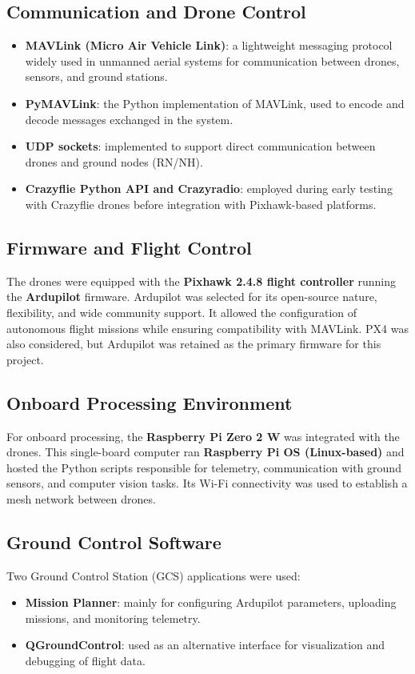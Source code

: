 \subsection*{Communication and Drone Control}
\begin{itemize}
    \item \textbf{MAVLink (Micro Air Vehicle Link)}: a lightweight messaging protocol 
    widely used in unmanned aerial systems for communication between drones, sensors, 
    and ground stations.  
    \item \textbf{PyMAVLink}: the Python implementation of MAVLink, used to encode and 
    decode messages exchanged in the system.  
    \item \textbf{UDP sockets}: implemented to support direct communication between 
    drones and ground nodes (RN/NH).  
    \item \textbf{Crazyflie Python API and Crazyradio}: employed during early testing 
    with Crazyflie drones before integration with Pixhawk-based platforms.  
\end{itemize}

\subsection*{Firmware and Flight Control}
The drones were equipped with the \textbf{Pixhawk 2.4.8 flight controller} running 
the \textbf{Ardupilot} firmware. Ardupilot was selected for its open-source nature, 
flexibility, and wide community support. It allowed the configuration of autonomous 
flight missions while ensuring compatibility with MAVLink. PX4 was also considered, 
but Ardupilot was retained as the primary firmware for this project.

\subsection*{Onboard Processing Environment}
For onboard processing, the \textbf{Raspberry Pi Zero 2 W} was integrated with the drones. 
This single-board computer ran \textbf{Raspberry Pi OS (Linux-based)} and hosted the 
Python scripts responsible for telemetry, communication with ground sensors, 
and computer vision tasks. Its Wi-Fi connectivity was used to establish a mesh 
network between drones.

\subsection*{Ground Control Software}
Two Ground Control Station (GCS) applications were used:  
\begin{itemize}
    \item \textbf{Mission Planner}: mainly for configuring Ardupilot parameters, 
    uploading missions, and monitoring telemetry.  
    \item \textbf{QGroundControl}: used as an alternative interface for visualization 
    and debugging of flight data.  
\end{itemize}

